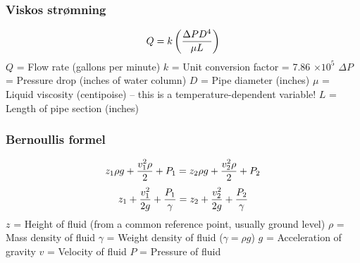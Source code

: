 \documentclass[aspectratio=169,xcolor=dvipsnames]{beamer}
\begin{document}
\begin{frame}
	\frametitle{Viskos strømning}

	


%
%
$$Q = k \left({{\Delta P D^4} \over {\mu L}}\right)$$
%
%
$Q$ = Flow rate (gallons per minute)
%
$k$ = Unit conversion factor = 7.86 $\times 10^5$
%
$\Delta P$ = Pressure drop (inches of water column)
%
$D$ = Pipe diameter (inches)
%
$\mu$ = Liquid viscosity (centipoise) -- this is a temperature-dependent variable!
%
$L$ = Length of pipe section (inches)
%
\end{frame}
%
%
%
%
%
%
\begin{frame}
	\frametitle{Bernoullis formel}

	


%
%
%
$$z_1 \rho g + {v_1^2 \rho \over 2} + P_1 = z_2 \rho g + {v_2^2 \rho \over 2} + P_2$$
%
$$z_1 + {v_1^2 \over {2 g}} + {P_1 \over \gamma} = z_2 + {v_2^2 \over {2 g}} + {P_2 \over \gamma}$$
%
%
$z$ = Height of fluid (from a common reference point, usually ground level)
%
$\rho$ = Mass density of fluid
%
$\gamma$ = Weight density of fluid ($\gamma = \rho g$)
%
$g$ = Acceleration of gravity
%
$v$ = Velocity of fluid
%
$P$ = Pressure of fluid
%
\end{frame}
\end{document}
